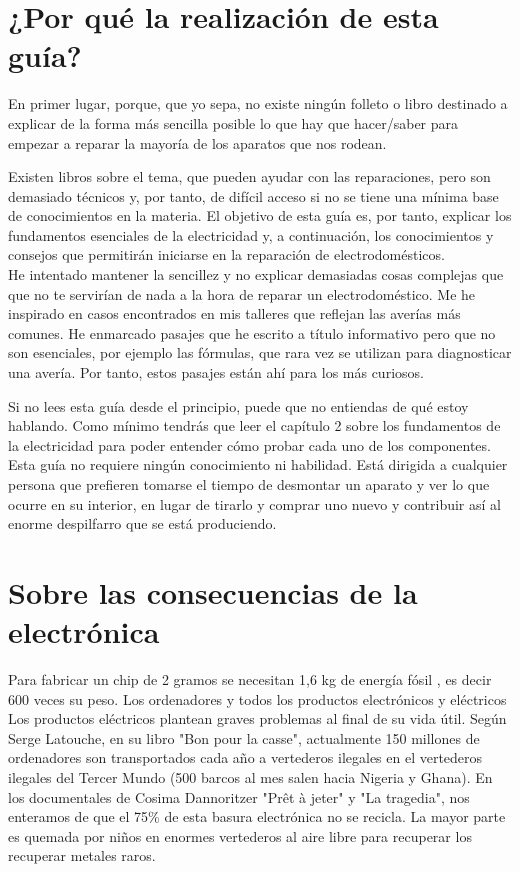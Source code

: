 \section{¿Por qué la realización de esta guía?}
En primer lugar, porque, que yo sepa, no existe ningún folleto o libro destinado a explicar de la forma más sencilla posible lo que hay que hacer/saber para empezar a reparar la mayoría de los aparatos que nos rodean.

Existen libros sobre el tema, que pueden ayudar con las reparaciones, pero son demasiado técnicos  y, por tanto, de difícil acceso si no se tiene una mínima base de conocimientos en la materia.
El objetivo de esta guía es, por tanto, explicar los fundamentos esenciales de la electricidad y, a continuación, los conocimientos y consejos que permitirán iniciarse en la reparación de electrodomésticos.\\

He intentado mantener la sencillez y no explicar demasiadas cosas complejas que
que no te servirían de nada a la hora de reparar un electrodoméstico. Me he inspirado en casos encontrados en mis talleres que reflejan las averías más comunes.
He enmarcado pasajes que he escrito a título informativo pero que no son
esenciales, por ejemplo las fórmulas, que rara vez se utilizan para diagnosticar una avería.
Por tanto, estos pasajes están ahí para los más curiosos.

Si no lees esta guía desde el principio, puede que no entiendas de qué estoy hablando.
Como mínimo tendrás que leer el capítulo 2 sobre los fundamentos de la electricidad para poder entender cómo probar cada uno de los componentes.\\

Esta guía no requiere ningún conocimiento ni habilidad. Está dirigida a cualquier persona que prefieren tomarse el tiempo de desmontar un aparato y ver
lo que ocurre en su interior, en lugar de tirarlo y comprar uno nuevo
y contribuir así al enorme despilfarro que se está produciendo.

\section{Sobre las consecuencias de la electrónica}


Para fabricar un chip de 2 gramos se necesitan 1,6 kg de energía fósil \cite{EricD}, es decir
600 veces su peso. Los ordenadores y todos los productos electrónicos y eléctricos
Los productos eléctricos plantean graves problemas al final de su vida útil.
Según Serge Latouche, en su libro "Bon pour la casse", actualmente
150 millones de ordenadores son transportados cada año a vertederos ilegales en el
vertederos ilegales del Tercer Mundo (500 barcos al mes salen hacia Nigeria y
Ghana).
En los documentales de Cosima Dannoritzer "Prêt à jeter" y "La tragedia", nos enteramos de que el 75\% de esta basura electrónica no se recicla.
La mayor parte es quemada por niños en enormes vertederos al aire libre para recuperar los
recuperar metales raros.

